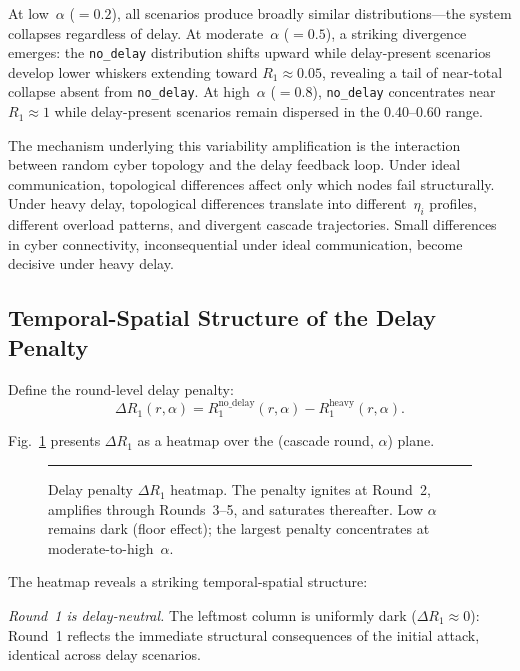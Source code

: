\documentclass[a4paper,fleqn]{cas-dc}
\newcommand{\Rone}{R_1}
\newcommand{\nodelay}{\texttt{no\_delay}}
\begin{document}
At low~$\alpha$ ($=0.2$), all scenarios produce broadly similar
distributions---the system collapses regardless of delay.  At
moderate~$\alpha$ ($=0.5$), a striking divergence emerges: the \nodelay{}
distribution shifts upward while delay-present scenarios develop lower
whiskers extending toward $\Rone\approx0.05$, revealing a tail of
near-total collapse absent from \nodelay{}.  At high~$\alpha$ ($=0.8$),
\nodelay{} concentrates near $\Rone\approx1$ while delay-present
scenarios remain dispersed in the 0.40--0.60 range.

The mechanism underlying this variability amplification is the
interaction between random cyber topology and the delay feedback loop.
Under ideal communication, topological differences affect only which
nodes fail structurally.  Under heavy delay, topological differences
translate into different~$\eta_i$ profiles, different overload patterns,
and divergent cascade trajectories.  Small differences in cyber
connectivity, inconsequential under ideal communication, become decisive
under heavy delay.

\subsection{Temporal-Spatial Structure of the Delay Penalty}\label{sec:heatmap}

Define the round-level delay penalty:
\begin{equation}\label{eq:penalty}
  \Delta\Rone(r,\alpha)
  = \Rone^{\text{no\_delay}}(r,\alpha) - \Rone^{\text{heavy}}(r,\alpha).
\end{equation}

Fig.~\ref{fig:heatmap} presents $\Delta\Rone$ as a heatmap over the
(cascade round, $\alpha$) plane.

\begin{figure}[t]
\centering
\rule{\columnwidth}{4cm}  %
\caption{Delay penalty $\Delta\Rone$ heatmap.  The penalty ignites at
  Round~2, amplifies through Rounds~3--5, and saturates thereafter.  Low
  $\alpha$ remains dark (floor effect); the largest penalty concentrates
  at moderate-to-high~$\alpha$.}\label{fig:heatmap}
\end{figure}

The heatmap reveals a striking temporal-spatial structure:

\emph{Round~1 is delay-neutral.}  The leftmost column is uniformly dark
($\Delta\Rone\approx0$): Round~1 reflects the immediate structural
consequences of the initial attack, identical across delay scenarios.
\end{document}
